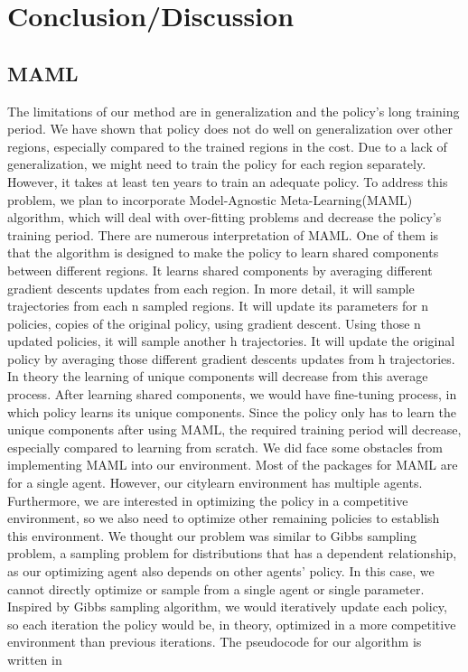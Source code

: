 \documentclass{article}
\begin{document}
\section{Conclusion/Discussion}


\subsection{MAML}

The limitations of our method are in generalization and the policy's long training period. We have shown that policy does not do well on generalization over other regions, especially compared to the trained regions in the cost. Due to a lack of generalization, we might need to train the policy for each region separately. However, it takes at least ten years to train an adequate policy. To address this problem, we plan to incorporate Model-Agnostic Meta-Learning(MAML) algorithm, which will deal with over-fitting problems and decrease the policy's training period.\cite{finn2017modelagnostic} There are numerous interpretation of MAML. One of them is that the algorithm is designed to make the policy to learn shared components between different regions. It learns shared components by averaging different gradient descents updates from each region. In more detail, it will sample trajectories from each n sampled regions. It will update its parameters for n policies, copies of the original policy, using gradient descent. Using those n updated policies, it will sample another h trajectories. It will update the original policy by averaging those different gradient descents updates from h trajectories. In theory the learning of unique components will decrease from this average process. After learning shared components, we would have fine-tuning process, in which policy learns its unique components. Since the policy only has to learn the unique components after using MAML, the required training period will decrease, especially compared to learning from scratch. 
\newline
We did face some obstacles from implementing MAML into our environment. Most of the packages for MAML are for a single agent. However, our citylearn environment has multiple agents. Furthermore, we are interested in optimizing the policy in a competitive environment, so we also need to optimize other remaining policies to establish this environment. We thought our problem was similar to Gibbs sampling problem, a sampling problem for distributions that has a dependent relationship, as our optimizing agent also depends on other agents' policy. In this case, we cannot directly optimize or sample from a single agent or single parameter. Inspired by Gibbs sampling algorithm, we would iteratively update each policy, so each iteration the policy would be, in theory, optimized in a more competitive environment than previous iterations. The pseudocode for our algorithm is written in
\newline
\end{document}
